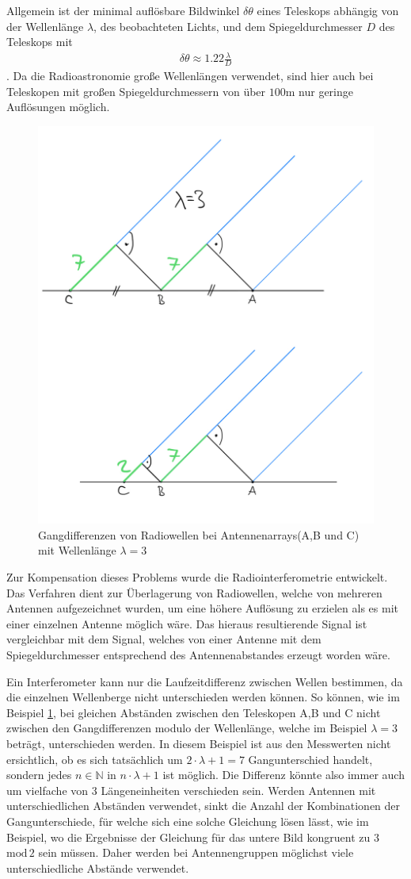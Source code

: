 \documentclass[]{dsadokumentation}
\begin{document}
Allgemein ist der minimal auflösbare Bildwinkel $\delta\theta$ eines Teleskops abhängig von der Wellenlänge $\lambda$, des beobachteten Lichts, und dem Spiegeldurchmesser $D$ des Teleskops mit \begin{eqnarray}
\delta\theta\approx1.22\frac{\lambda}{D}
\end{eqnarray}.
Da die Radioastronomie große Wellenlängen verwendet, sind hier auch bei Teleskopen mit großen Spiegeldurchmessern von über $100\text{m}$ nur geringe Auflösungen möglich.

\begin{figure}[htb]
\centering
\includegraphics[width=.4\textwidth]{k4.2/baselineunterschied.png}
\caption{Gangdifferenzen von Radiowellen bei Antennenarrays(A,B und C) mit Wellenlänge $\lambda = 3$}
\label{bild-baselineunterschied}
\end{figure}

Zur Kompensation dieses Problems wurde die Radiointerferometrie entwickelt.
Das Verfahren dient zur Überlagerung von Radiowellen, welche von mehreren Antennen aufgezeichnet wurden, um eine höhere Auflösung zu erzielen als es mit einer einzelnen Antenne möglich wäre.
Das hieraus resultierende Signal ist vergleichbar mit dem Signal, welches von einer Antenne mit dem Spiegeldurchmesser entsprechend des Antennenabstandes erzeugt worden wäre.

Ein Interferometer kann nur die Laufzeitdifferenz zwischen Wellen bestimmen, da die einzelnen Wellenberge nicht unterschieden werden können. So können, wie im Beispiel  \cref{bild-baselineunterschied}, bei gleichen Abständen zwischen den Teleskopen A,B und C nicht zwischen den Gangdifferenzen modulo der Wellenlänge, welche im Beispiel $\lambda = 3$ beträgt, unterschieden werden. In diesem Beispiel ist aus den Messwerten nicht ersichtlich, ob es sich tatsächlich um $2\cdot \lambda +1 = 7$ Gangunterschied handelt, sondern jedes $n\in \mathbb{N}$ in $n\cdot\lambda+1$ ist möglich. Die Differenz könnte also immer auch um vielfache von 3 Längeneinheiten verschieden sein. Werden Antennen mit unterschiedlichen Abständen verwendet, sinkt die Anzahl der Kombinationen der Gangunterschiede, für welche sich eine solche Gleichung lösen lässt, wie im Beispiel, wo die Ergebnisse der Gleichung für das untere Bild kongruent zu 3 $\mathrm{mod}\,2$ sein müssen. Daher werden bei Antennengruppen möglichst viele unterschiedliche Abstände verwendet.
\end{document}
